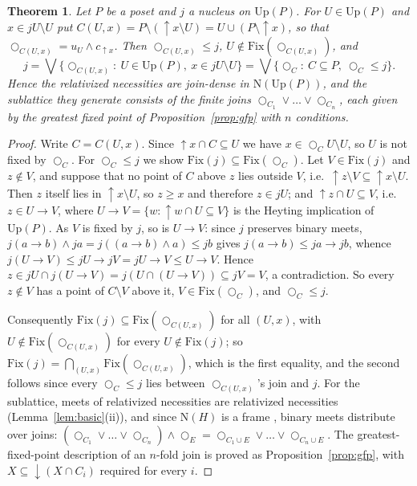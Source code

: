 \documentclass[11pt]{amsart}
\newtheorem{thm}{Theorem}[section]
\theoremstyle{definition}
\newcommand{\Fix}{\mathrm{Fix}}
\newcommand{\Up}{\mathrm{Up}}
\newcommand{\Nuc}{\mathrm{N}}
\newcommand{\lax}{\bigcirc}
\newcommand{\dn}{{\downarrow}}
\newcommand{\upa}{{\uparrow}}
\begin{document}
\begin{thm}\label{thm:dense}
Let $P$ be a poset and $j$ a nucleus on $\Up(P)$. For $U\in\Up(P)$ and
$x\in jU\setminus U$ put $C(U,x)=P\setminus(\upa x\setminus U)=U\cup(P\setminus\upa x)$,
so that $\lax_{C(U,x)}=u_U\wedge c_{\upa x}$. Then
$\lax_{C(U,x)}\le j$, $U\notin\Fix(\lax_{C(U,x)})$, and
\[
j=\bigvee\{\lax_{C(U,x)}:\ U\in\Up(P),\ x\in jU\setminus U\}
=\bigvee\{\lax_C:\ C\subseteq P,\ \lax_C\le j\}.
\]
Hence the relativized necessities are join-dense in $\Nuc(\Up(P))$, and the
sublattice they generate consists of the finite joins
$\lax_{C_1}\vee\dots\vee\lax_{C_n}$, each given by the greatest fixed point of
Proposition~\ref{prop:gfp} with $n$ conditions.
\end{thm}
\begin{proof}
Write $C=C(U,x)$. Since $\upa x\cap C\subseteq U$ we have $x\in\lax_CU\setminus U$,
so $U$ is not fixed by $\lax_C$. For $\lax_C\le j$ we show
$\Fix(j)\subseteq\Fix(\lax_C)$. Let $V\in\Fix(j)$ and $z\notin V$, and suppose
that no point of $C$ above $z$ lies outside $V$, i.e.\
$\upa z\setminus V\subseteq\upa x\setminus U$. Then $z$ itself lies in
$\upa x\setminus U$, so $z\ge x$ and therefore $z\in jU$; and
$\upa z\cap U\subseteq V$, i.e.\ $z\in U\to V$, where $U\to V=\{w:\upa w\cap U
\subseteq V\}$ is the Heyting implication of $\Up(P)$. As $V$ is fixed by
$j$, so is $U\to V$: since $j$ preserves binary meets, $j(a\to b)\wedge ja
=j((a\to b)\wedge a)\le jb$ gives $j(a\to b)\le ja\to jb$, whence
$j(U\to V)\le jU\to jV=jU\to V\le U\to V$. Hence
$z\in jU\cap j(U\to V)=j(U\cap(U\to V))\subseteq jV=V$, a contradiction. So
every $z\notin V$ has a point of $C\setminus V$ above it, $V\in\Fix(\lax_C)$,
and $\lax_C\le j$.

Consequently $\Fix(j)\subseteq\Fix(\lax_{C(U,x)})$ for all $(U,x)$, with
$U\notin\Fix(\lax_{C(U,x)})$ for every $U\notin\Fix(j)$; so
$\Fix(j)=\bigcap_{(U,x)}\Fix(\lax_{C(U,x)})$, which is the first equality, and
the second follows since every $\lax_C\le j$ lies between $\lax_{C(U,x)}$'s
join and $j$. For the sublattice, meets of relativized necessities are
relativized necessities (Lemma~\ref{lem:basic}(ii)), and since $\Nuc(H)$ is a
frame \cite{Johnstone}, binary meets distribute over joins:
$(\lax_{C_1}\vee\dots\vee\lax_{C_n})\wedge\lax_E=\lax_{C_1\cup E}\vee\dots\vee
\lax_{C_n\cup E}$. The greatest-fixed-point description of an $n$-fold join is
proved as Proposition~\ref{prop:gfp}, with $X\subseteq\dn(X\cap C_i)$ required
for every $i$.
\end{proof}
\end{document}
